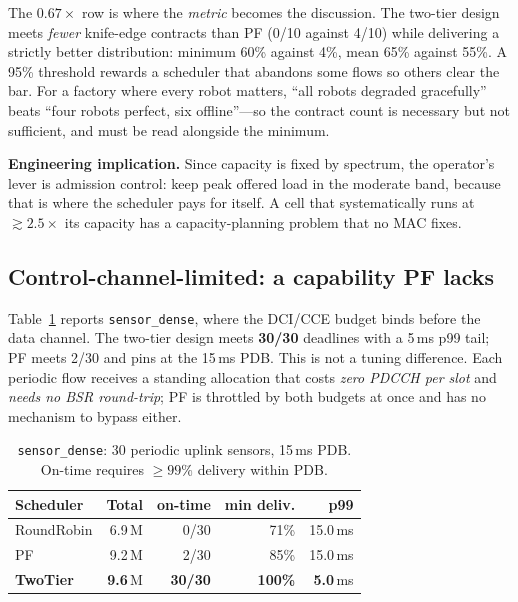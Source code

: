 \documentclass[conference]{IEEEtran}
\begin{document}
The $0.67\times$ row is where the \emph{metric} becomes the discussion.
The two-tier design meets \emph{fewer} knife-edge contracts than PF (0/10
against 4/10) while delivering a strictly better distribution: minimum 60\%
against 4\%, mean 65\% against 55\%. A 95\% threshold rewards a scheduler
that abandons some flows so others clear the bar. For a factory where every
robot matters, ``all robots degraded gracefully'' beats ``four robots
perfect, six offline''---so the contract count is necessary but not
sufficient, and must be read alongside the minimum.

\textbf{Engineering implication.} Since capacity is fixed by spectrum, the
operator's lever is admission control: keep peak offered load in the
moderate band, because that is where the scheduler pays for itself. A cell
that systematically runs at ${\gtrsim}2.5\times$ its capacity has a
capacity-planning problem that no MAC fixes.

\subsection{Control-channel-limited: a capability PF lacks}\label{sec:pdcch}

Table~\ref{tab:sensor} reports \texttt{sensor\_dense}, where the DCI/CCE
budget binds before the data channel. The two-tier design meets
\textbf{30/30} deadlines with a 5\,ms p99 tail; PF meets 2/30 and pins at
the 15\,ms PDB. This is not a tuning difference. Each periodic flow
receives a standing allocation that costs \emph{zero PDCCH per slot} and
\emph{needs no BSR round-trip}; PF is throttled by both budgets at once and
has no mechanism to bypass either.

\begin{table}[t]
\caption{\texttt{sensor\_dense}: 30 periodic uplink sensors, 15\,ms PDB.
On-time requires $\ge 99\%$ delivery within PDB.}
\label{tab:sensor}
\centering
\small
\begin{tabular}{@{}lrrrr@{}}
\toprule
Scheduler & Total & on-time & min deliv. & p99 \\
\midrule
RoundRobin & 6.9\,M & 0/30  & 71\%  & 15.0\,ms \\
PF         & 9.2\,M & 2/30  & 85\%  & 15.0\,ms \\
\textbf{TwoTier}  & \textbf{9.6}\,M & \textbf{30/30} & \textbf{100\%} & \textbf{5.0}\,ms \\
\bottomrule
\end{tabular}
\end{table}
\end{document}
